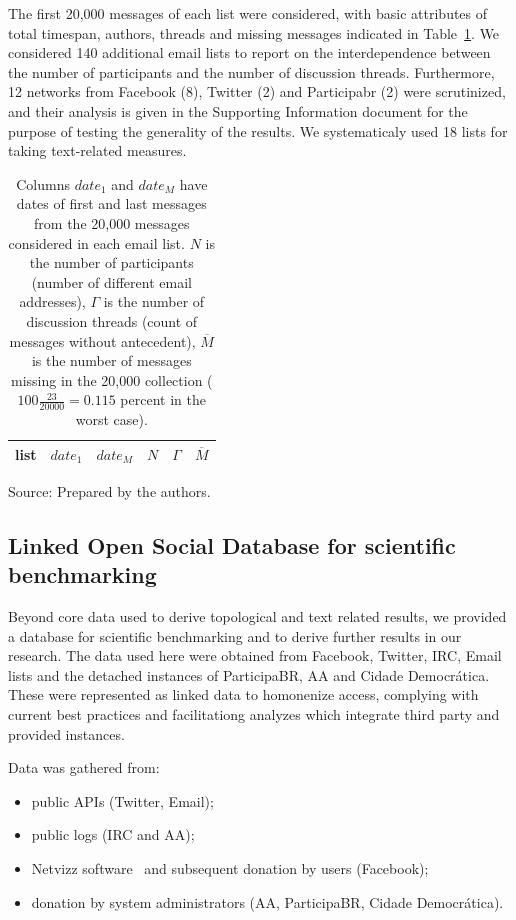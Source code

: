 The first 20,000 messages of each list were considered, with basic attributes of total timespan, authors, threads and missing messages indicated in Table~\ref{tab:genLists}. We considered 140 additional email lists to report on the interdependence between the number of participants and the number of discussion threads. Furthermore, 12 networks from Facebook (8), Twitter (2) and Participabr (2) were scrutinized, and their analysis is given in the Supporting Information document for the purpose of testing the generality of the results.
We systematicaly used 18 lists for taking text-related measures.

 
\begin{table}
\centering
\caption{Columns $date_1$ and $date_M$ have dates of first and last messages from the 20,000 messages considered in each email list.
$N$ is the number of participants (number of different email addresses),
$\Gamma$ is the number of discussion threads (count of messages without antecedent),
$\overline{M}$ is the number of messages missing in the 20,000 collection
($100\frac{23}{20000}=0.115$ percent in the worst case).
}
\label{tab:genLists}
\begin{tabular}{|l|c|c|c|c|c|}\hline
list & $date_1$ & $date_{M}$    & $N$  & $\Gamma$ & $\overline{M}$ \\\hline

\end{tabular}
\begin{flushleft}
		Source: Prepared by the authors.\
\end{flushleft}
\end{table} 

\subsection{Linked Open Social Database for scientific benchmarking}
Beyond core data used to derive topological and text related results,
we provided a database for scientific benchmarking and to derive further results in our research.
The data used here were obtained from Facebook, Twitter, IRC, Email lists and the
detached instances of ParticipaBR, AA and Cidade Democr\'atica.
These were represented as linked data to homonenize access,
complying with current best practices and facilitationg analyzes which integrate third
party and provided instances. 
 
Data was gathered from:
\begin{itemize}
	\item public APIs (Twitter, Email);
	\item public logs (IRC and AA);
	\item Netvizz software~\cite{netvizz} and subsequent donation by users (Facebook);
	\item donation by system administrators (AA, ParticipaBR, Cidade Democr\'atica).
\end{itemize}

